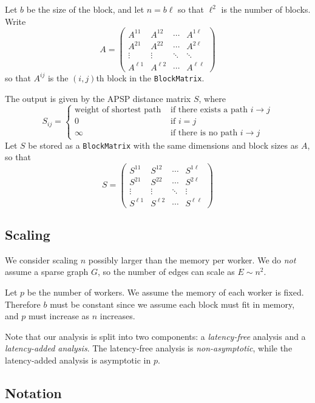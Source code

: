 \documentclass{article} %
\begin{document}
Let $b$ be the size of the block, and let $n = b\ell$ so that $\ell^2$
is the number of blocks.  Write
\[
A = \begin{pmatrix}
A^{11} & A^{12} & \cdots & A^{1\ell}\\
A^{21} & A^{22} & \cdots & A^{2\ell}\\
\vdots & \vdots & \ddots & \ddots\\
A^{\ell 1} & A^{\ell 2} & \cdots & A^{\ell \ell}
\end{pmatrix}
\]
so that $A^{ij}$ is the $(i,j)$th block in the {\tt BlockMatrix}.

The output is given by the APSP distance matrix $S$, where
\[
S_{ij} = 
\begin{cases}
\text{weight of shortest path} &\text{ if there exists a path } i \to j\\
0 &\text{ if } i = j\\
\infty &\text{ if there is no path } i \to j
\end{cases}
\]
Let $S$ be stored as a {\tt BlockMatrix} with the same dimensions and
block sizes as $A$, so that
\[
S = \begin{pmatrix}
S^{11} & S^{12} & \cdots & S^{1\ell}\\
S^{21} & S^{22} & \cdots & S^{2\ell}\\
\vdots & \vdots & \ddots & \vdots\\
S^{\ell 1} & S^{\ell 2} & \cdots & S^{\ell \ell}
\end{pmatrix}
\]

\subsection{Scaling}

We consider scaling $n$ possibly larger than the memory per
worker.  We do \emph{not} assume a sparse graph $G$, so the number of
edges can scale as $E \sim n^2$.

Let $p$ be the number of workers.  We assume the memory of each worker
is fixed.  Therefore $b$ must be constant since we assume each block
must fit in memory, and $p$ must increase as $n$ increases.

Note that our analysis is split into two components: a \emph{latency-free} analysis and a \emph{latency-added analysis}.  The latency-free analysis is \emph{non-asymptotic}, while the latency-added analysis is asymptotic in $p$.

\subsection{Notation}
\end{document}
